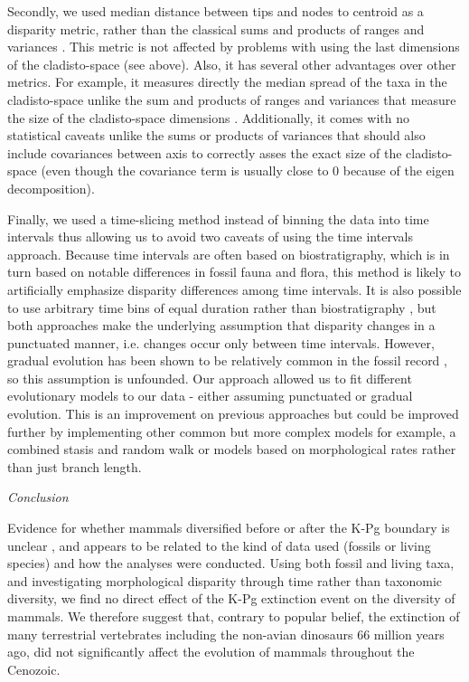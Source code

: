 \documentclass[12pt,letterpaper]{article}
\renewcommand{\subsection}[1]{%
\bigskip
\begin{center}
\begin{large}
\normalfont\itshape #1
\end{large}
\end{center}}
\begin{document}
Secondly, we used median distance between tips and nodes to centroid as a disparity metric, rather than the classical sums and products of ranges and variances \citep{Wills1994}.
This metric is not affected by problems with using the last dimensions of the cladisto-space (see above).
Also, it has several other advantages over other metrics.
For example, it measures directly the median spread of the taxa in the cladisto-space unlike the sum and products of ranges and variances that measure the size of the cladisto-space dimensions \citep{Wills1994}.
Additionally, it comes with no statistical caveats %
 unlike the sums or products of variances that should also include covariances between axis to correctly asses the exact size of the cladisto-space (even though the covariance term is usually close to 0 because of the eigen decomposition).

Finally, we used a time-slicing method instead of binning the data into time intervals \citep[e.g in:][]{cisneros2010,prentice2011,Hughes20082013,hopkinsdecoupling2013,bentonmodels2014,bensonfaunal2014} thus allowing us to avoid two caveats of using the time intervals approach.
Because time intervals are often based on biostratigraphy, which is in turn based on notable differences in fossil fauna and flora, this method is likely to artificially emphasize disparity differences among time intervals.
It is also possible to use arbitrary time bins of equal duration rather than biostratigraphy \citep{Butler2012,hopkinsdecoupling2013,bensonfaunal2014}, but both approaches make the underlying assumption that disparity changes in a punctuated  manner, i.e. changes occur only between time intervals.
However, gradual evolution has been shown to be relatively common in the fossil record \citep{Hunt20112007,Hunt21042015}, so this assumption is unfounded.
Our approach allowed us to fit different evolutionary models to our data - either assuming punctuated or gradual evolution.
This is an improvement on previous approaches but could be improved further by implementing other common but more complex models for example, a combined stasis and random walk \citep{Hunt21042015} or models based on morphological rates rather than just branch length.

\subsection{Conclusion}
Evidence for whether mammals diversified before or after the K-Pg boundary is unclear \citep{meredithimpacts2011,O'Leary08022013,dosReis2014,beckancient2014}, and appears to be related to the kind of data used (fossils or living species) and how the analyses were conducted.
Using both fossil and living taxa, and investigating morphological disparity through time rather than taxonomic diversity, we find no direct effect of the K-Pg extinction event on the diversity of mammals. 
We therefore suggest that, contrary to popular belief, the extinction of many terrestrial vertebrates including the non-avian dinosaurs 66 million years ago, did not significantly affect the evolution of mammals throughout the Cenozoic.
\end{document}
